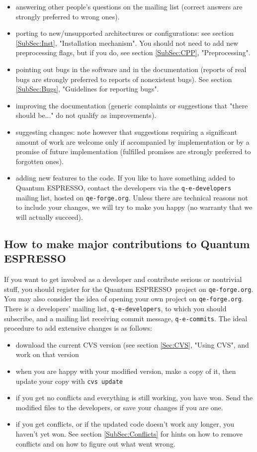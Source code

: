 \documentclass[12pt,a4paper]{article}
\def\qe{{\sc Quantum ESPRESSO}}
\def\qeforge{\texttt{qe-forge.org}}
\begin{document}
\begin{itemize}
\item answering other people's questions on the mailing list (correct
  answers are strongly preferred to wrong ones). 
\item porting to new/unsupported architectures or configurations: see
  section \ref{SubSec:Inst}, "Installation mechanism". You should
  not need to add new preprocessing flags, but if you do, 
  see section \ref{SubSec:CPP}, "Preprocessing".
\item pointing out bugs in the software and in the documentation
  (reports of real bugs are strongly preferred to reports of
  nonexistent bugs). See section \ref{SubSec:Bugs}, "Guidelines 
  for reporting bugs".
\item improving the documentation (generic complaints or suggestions
  that "there should be..." do not qualify as improvements). 
\item  suggesting changes: note however that suggestions requiring a
  significant amount of work are welcome only if accompanied by
  implementation or by a promise of future implementation (fulfilled
  promises are strongly preferred to forgotten ones). 
\item adding new features to the code. If you like to have something
  added to \qe, contact the developers via the
 \texttt{q-e-developers} mailing list, hosted on \qeforge.
 Unless there are technical reasons not to include your changes, we 
 will try to make you happy (no warranty that we will actually succeed).
\end{itemize}

\subsection{How to make major contributions to \qe}
If you want to get involved as a developer and contribute serious
or nontrivial stuff, you should register for the \qe\ project on 
\qeforge. You may also consider the idea of opening
your own project on \qeforge. There is a developers' 
mailing list, \texttt{q-e-developers}, to which you should subscribe,
and a mailing list receiving commit message, \texttt{q-e-commits}.
The ideal procedure to add extensive changes is as follows:
\begin{itemize}
\item download the current CVS version (see 
section \ref{Sec:CVS}, "Using CVS", and work on that version
\item when you are happy with your modified version, make a copy of
  it, then update your copy with \texttt{cvs update} 
\item if you get no conflicts and everything is still working, you
  have won. Send the modified files to the developers, or save
  your changes if you are one.
\item if you get conflicts, or if the updated code doesn't work any
  longer, you haven't yet won. See section
  \ref{SubSec:Conflicts} for hints on how to 
  remove conflicts and on how to figure out
   what went wrong.
\end{itemize}
\end{document}
